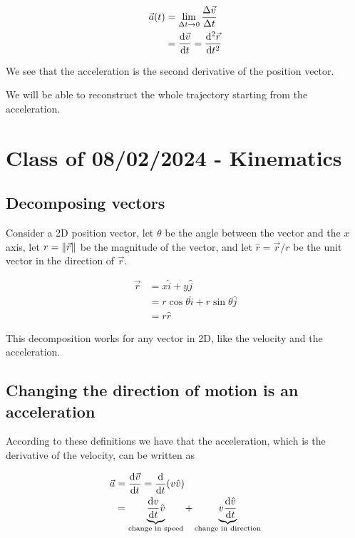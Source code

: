 \documentclass[10pt]{extarticle}
\begin{document}
\begin{align*}
    \vec{a}(t) & = \lim_{\Delta t \to 0} \frac{\Delta \vec{v}}{\Delta t} \\
               & = \dv{\vec{v}}{t} = \dv[2]{\vec{r}}{t}
\end{align*}

We see that the acceleration is the second derivative of the position vector.

We will be able to reconstruct the whole trajectory starting from the acceleration.

\section{Class of 08/02/2024 - Kinematics}

\subsection{Decomposing vectors}

Consider a 2D position vector, let $\theta$ be the angle between the vector and the $x$ axis,
let $r = \norm{\vec{r}}$ be the magnitude of the vector,
and let $\hat{r} = \vec{r} / r$ be the unit vector in the direction of $\vec{r}$.

\begin{align*}
    \vec{r} & = x \hat{i} + y \hat{j}                         \\
            & = r \cos \theta \hat{i} + r \sin \theta \hat{j} \\
            & = r \hat{r}
\end{align*}

This decomposition works for any vector in 2D, like the velocity and the acceleration.

\subsection{Changing the direction of motion is an acceleration}

According to these definitions we have that the acceleration, which is the derivative of the velocity, can be written as

\begin{align*}
    \vec{a} & = \dv{\vec{v}}{t} = \dv{t} (v \hat{v}) \\ &=
    \underbrace{ \dv{v}{t} \hat{v} }_{\text{change in speed}} +
    \underbrace{ v \dv{\hat{v}}{t} }_{\text{change in direction}}
\end{align*}
\end{document}

